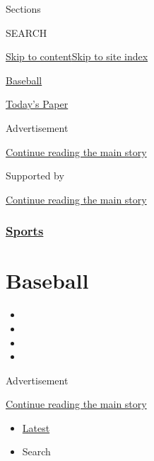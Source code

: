 Sections

SEARCH

\protect\hyperlink{site-content}{Skip to
content}\protect\hyperlink{site-index}{Skip to site index}

\href{https://www.nytimes.com/section/sports/baseball}{Baseball}

\href{https://myaccount.nytimes.com/auth/login?response_type=cookie\&client_id=vi}{}

\href{https://www.nytimes.com/section/todayspaper}{Today's Paper}

Advertisement

\protect\hyperlink{after-top}{Continue reading the main story}

Supported by

\protect\hyperlink{after-sponsor}{Continue reading the main story}

\hypertarget{sports}{%
\subsubsection{\texorpdfstring{\href{/section/sports}{Sports}}{Sports}}\label{sports}}

\hypertarget{baseball}{%
\section{Baseball}\label{baseball}}

\begin{itemize}
\item
\item
\item
\item
\end{itemize}

Advertisement

\protect\hyperlink{after-subheader}{Continue reading the main story}

\begin{itemize}
\tightlist
\item
  \protect\hyperlink{stream-panel}{Latest}
\item
  Search
\end{itemize}


